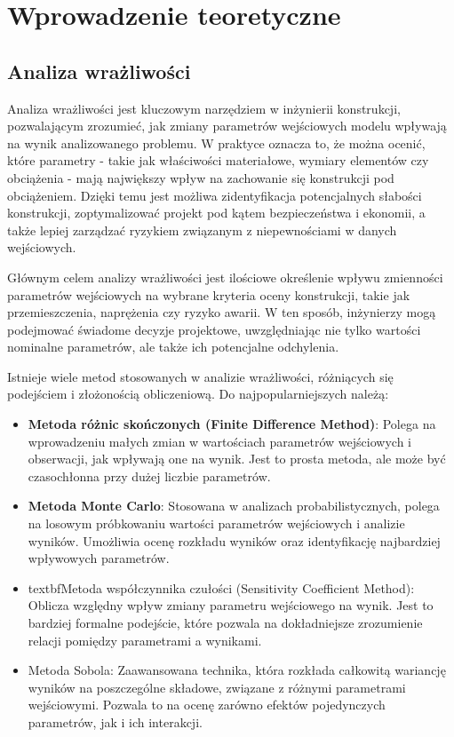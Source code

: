 \newpage
\section{Wprowadzenie teoretyczne}

\subsection{Analiza wrażliwości}

Analiza wrażliwości jest kluczowym narzędziem w inżynierii konstrukcji, pozwalającym zrozumieć, jak zmiany parametrów wejściowych modelu wpływają na wynik analizowanego problemu.
W praktyce oznacza to, że można ocenić, które parametry - takie jak właściwości materiałowe, wymiary elementów czy obciążenia - mają największy wpływ na zachowanie się konstrukcji pod obciążeniem.
Dzięki temu jest możliwa zidentyfikacja potencjalnych słabości konstrukcji, zoptymalizować projekt pod kątem bezpieczeństwa i ekonomii, a także lepiej zarządzać ryzykiem związanym z niepewnościami w danych wejściowych.

Głównym celem analizy wrażliwości jest ilościowe określenie wpływu zmienności parametrów wejściowych na wybrane kryteria oceny konstrukcji, takie jak przemieszczenia, naprężenia czy ryzyko awarii.
W ten sposób, inżynierzy mogą podejmować świadome decyzje projektowe, uwzględniając nie tylko wartości nominalne parametrów, ale także ich potencjalne odchylenia.

Istnieje wiele metod stosowanych w analizie wrażliwości, różniących się podejściem i złożonością obliczeniową.
Do najpopularniejszych należą:

\begin{itemize}
    \item \textbf{Metoda różnic skończonych (Finite Difference Method)}: Polega na wprowadzeniu małych zmian w wartościach parametrów wejściowych i obserwacji, jak wpływają one na wynik. Jest to prosta metoda, ale może być czasochłonna przy dużej liczbie parametrów.
    \item \textbf{Metoda Monte Carlo}: Stosowana w analizach probabilistycznych, polega na losowym próbkowaniu wartości parametrów wejściowych i analizie wyników. Umożliwia ocenę rozkładu wyników oraz identyfikację najbardziej wpływowych parametrów.
    \item textbf{Metoda współczynnika czułości (Sensitivity Coefficient Method)}: Oblicza względny wpływ zmiany parametru wejściowego na wynik. Jest to bardziej formalne podejście, które pozwala na dokładniejsze zrozumienie relacji pomiędzy parametrami a wynikami.
    \item Metoda Sobola: Zaawansowana technika, która rozkłada całkowitą wariancję wyników na poszczególne składowe, związane z różnymi parametrami wejściowymi. Pozwala to na ocenę zarówno efektów pojedynczych parametrów, jak i ich interakcji.
\end{itemize}

